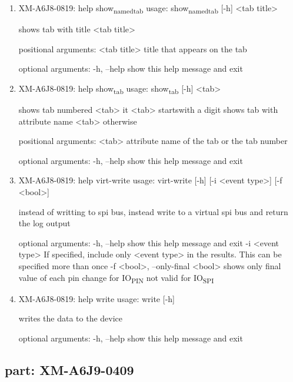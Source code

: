 \documentclass[11pt]{article}
\begin{document}
\begin{enumerate}
\item XM-A6J8-0819: help show\textsubscript{named}\textsubscript{tab}
\label{sec:org5d44a95}
usage: show\textsubscript{named}\textsubscript{tab} [-h] <tab title>

shows tab with title <tab title>

positional arguments:
  <tab title>  title that appears on the tab

optional arguments:
  -h, --help   show this help message and exit

\item XM-A6J8-0819: help show\textsubscript{tab}
\label{sec:orgfa0fd22}
usage: show\textsubscript{tab} [-h] <tab>

shows tab numbered <tab> it <tab> startswith a digit shows tab with attribute
name <tab> otherwise

positional arguments:
  <tab>       attribute name of the tab or the tab number

optional arguments:
  -h, --help  show this help message and exit

\item XM-A6J8-0819: help virt-write
\label{sec:org993b6de}
usage: virt-write [-h] [-i <event type>] [-f <bool>]

instead of writting to spi bus, instead write to a virtual spi bus and return
the log output

optional arguments:
  -h, --help            show this help message and exit
  -i <event type>       If specified, include only <event type> in the
                        results. This can be specified more than once
  -f <bool>, --only-final <bool>
                        shows only final value of each pin change for IO\textsubscript{PIN}
                        not valid for IO\textsubscript{SPI}

\item XM-A6J8-0819: help write
\label{sec:orge9fcbbd}
usage: write [-h]

writes the data to the device

optional arguments:
  -h, --help  show this help message and exit
\end{enumerate}

\subsection{part: XM-A6J9-0409}
\label{sec:org8357c15}
\end{document}
